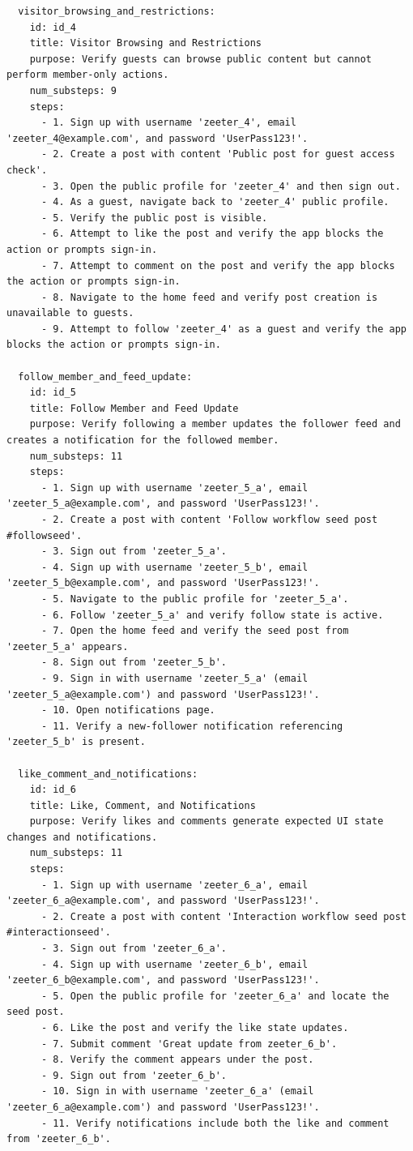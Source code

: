 \begin{lstlisting}
  visitor_browsing_and_restrictions:
    id: id_4
    title: Visitor Browsing and Restrictions
    purpose: Verify guests can browse public content but cannot perform member-only actions.
    num_substeps: 9
    steps:
      - 1. Sign up with username 'zeeter_4', email 'zeeter_4@example.com', and password 'UserPass123!'.
      - 2. Create a post with content 'Public post for guest access check'.
      - 3. Open the public profile for 'zeeter_4' and then sign out.
      - 4. As a guest, navigate back to 'zeeter_4' public profile.
      - 5. Verify the public post is visible.
      - 6. Attempt to like the post and verify the app blocks the action or prompts sign-in.
      - 7. Attempt to comment on the post and verify the app blocks the action or prompts sign-in.
      - 8. Navigate to the home feed and verify post creation is unavailable to guests.
      - 9. Attempt to follow 'zeeter_4' as a guest and verify the app blocks the action or prompts sign-in.

  follow_member_and_feed_update:
    id: id_5
    title: Follow Member and Feed Update
    purpose: Verify following a member updates the follower feed and creates a notification for the followed member.
    num_substeps: 11
    steps:
      - 1. Sign up with username 'zeeter_5_a', email 'zeeter_5_a@example.com', and password 'UserPass123!'.
      - 2. Create a post with content 'Follow workflow seed post #followseed'.
      - 3. Sign out from 'zeeter_5_a'.
      - 4. Sign up with username 'zeeter_5_b', email 'zeeter_5_b@example.com', and password 'UserPass123!'.
      - 5. Navigate to the public profile for 'zeeter_5_a'.
      - 6. Follow 'zeeter_5_a' and verify follow state is active.
      - 7. Open the home feed and verify the seed post from 'zeeter_5_a' appears.
      - 8. Sign out from 'zeeter_5_b'.
      - 9. Sign in with username 'zeeter_5_a' (email 'zeeter_5_a@example.com') and password 'UserPass123!'.
      - 10. Open notifications page.
      - 11. Verify a new-follower notification referencing 'zeeter_5_b' is present.

  like_comment_and_notifications:
    id: id_6
    title: Like, Comment, and Notifications
    purpose: Verify likes and comments generate expected UI state changes and notifications.
    num_substeps: 11
    steps:
      - 1. Sign up with username 'zeeter_6_a', email 'zeeter_6_a@example.com', and password 'UserPass123!'.
      - 2. Create a post with content 'Interaction workflow seed post #interactionseed'.
      - 3. Sign out from 'zeeter_6_a'.
      - 4. Sign up with username 'zeeter_6_b', email 'zeeter_6_b@example.com', and password 'UserPass123!'.
      - 5. Open the public profile for 'zeeter_6_a' and locate the seed post.
      - 6. Like the post and verify the like state updates.
      - 7. Submit comment 'Great update from zeeter_6_b'.
      - 8. Verify the comment appears under the post.
      - 9. Sign out from 'zeeter_6_b'.
      - 10. Sign in with username 'zeeter_6_a' (email 'zeeter_6_a@example.com') and password 'UserPass123!'.
      - 11. Verify notifications include both the like and comment from 'zeeter_6_b'.


\end{lstlisting}
